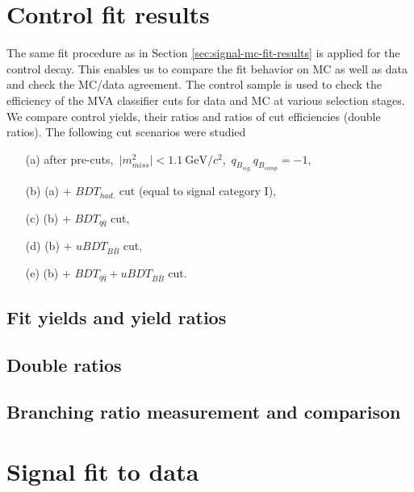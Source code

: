 \documentclass[headings=standardclasses,headings=big,oneside,a4paper,openany,12pt]{scrbook}
\newcommand {\e}[1]{\mathrm{~#1}}
\begin{document}
\section{Control fit results}

The same fit procedure as in Section \ref{sec:signal-mc-fit-results} is applied for the control decay. This enables us to compare the fit behavior on MC as well as data and check the MC/data agreement. The control sample is used to check the efficiency of the MVA classifier cuts for data and MC at various selection stages. We compare control yields, their ratios and ratios of cut efficiencies (double ratios). The following cut scenarios were studied
\begin{itemize}
\item[(a)]  after pre-cuts,\, $\vert m_{miss}^2 \vert < 1.1\e{GeV}/c^2$,\, $q_{B_{sig}}~q_{B_{comp}} = -1$,
\item[(b)] (a) + $BDT_{had.}$ cut (equal to signal category I),
\item[(c)] (b) + $BDT_{q\bar q}$ cut,
\item[(d)] (b) + $uBDT_{B\bar B}$ cut,
\item[(e)] (b) + $BDT_{q\bar q} + uBDT_{B\bar B}$ cut.
\end{itemize}





\subsection{Fit yields and yield ratios}
\subsection{Double ratios}
\subsection{Branching ratio measurement and comparison}

\section{Signal fit to data}
\end{document}
